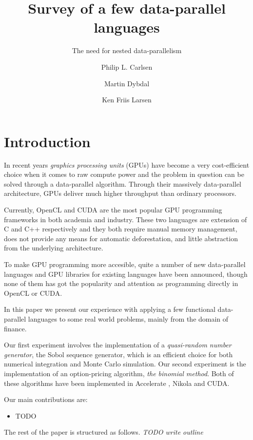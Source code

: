 \documentclass{llncs2e/llncs}
\title{Survey of a few data-parallel languages}
\subtitle{The need for nested data-parallelism} \author{Philip L. Carlsen \and Martin Dybdal \and Ken Friis Larsen}
\institute{University of Copenhagen \\ \email{plcplc@gmail.com,
    dybber@dybber.dk, kflarsen@diku.dk}}
\begin{document}
\maketitle

\section{Introduction}
In recent years \emph{graphics processing units} (GPUs) have become a
very cost-efficient choice when it comes to raw compute power and the
problem in question can be solved through a data-parallel
algorithm. Through their massively data-parallel architecture, GPUs
deliver much higher throughput than ordinary processors.

Currently, OpenCL and CUDA are the most popular GPU programming
frameworks in both academia and industry. These two languages are
extension of C and C++ respectively and they both require manual
memory management, does not provide any means for automatic
deforestation, and little abstraction from the underlying
architecture.

To make GPU programming more accesible, quite a number of new
data-parallel languages and GPU libraries for existing languages
\cite{Catanzaro2011, chakravarty2011accelerating, mainland2010nikola,
  svensson2011obsidian, bergstra2010theano, homepage:rgpu,
  bergstrom2012nested} have been announced, though none of them has
got the popularity and attention as programming directly in OpenCL or
CUDA.

In this paper we present our experience with applying a few functional
data-parallel languages to some real world problems, mainly from the
domain of finance. 

Our first experiment involves the implementation of a
\emph{quasi-random number generator}, the Sobol sequence generator,
which is an efficient choice for both numerical integration and Monte
Carlo simulation. Our second experiment is the implementation of an
option-pricing algorithm, \emph{the binomial method}. Both of these
algorithms have been implemented in Accelerate
\cite{chakravarty2011accelerating}, Nikola \cite{mainland2010nikola}
and CUDA.

Our main contributions are:
\begin{itemize}
\item TODO
\end{itemize}

The rest of the paper is structured as follows. \emph{TODO write outline}
\end{document}
